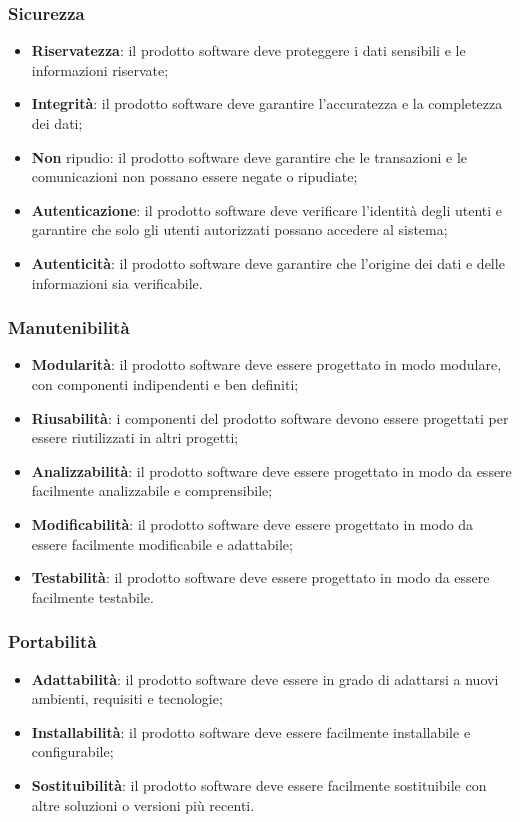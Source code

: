 \subsubsection{Sicurezza}
\begin{itemize}
    \item \textbf{Riservatezza}: il prodotto software deve proteggere i dati sensibili e le informazioni riservate;
    \item \textbf{Integrità}: il prodotto software deve garantire l'accuratezza e la completezza dei dati;
    \item \textbf{Non} ripudio: il prodotto software deve garantire che le transazioni e le comunicazioni non possano essere negate o ripudiate;
    \item \textbf{Autenticazione}: il prodotto software deve verificare l'identità degli utenti e garantire che solo gli utenti autorizzati possano accedere al sistema;
    \item \textbf{Autenticità}: il prodotto software deve garantire che l'origine dei dati e delle informazioni sia verificabile.
\end{itemize}
\subsubsection{Manutenibilità}
\begin{itemize}
    \item \textbf{Modularità}: il prodotto software deve essere progettato in modo modulare, con componenti indipendenti e ben definiti;
    \item \textbf{Riusabilità}: i componenti del prodotto software devono essere progettati per essere riutilizzati in altri progetti;
    \item \textbf{Analizzabilità}: il prodotto software deve essere progettato in modo da essere facilmente analizzabile e comprensibile;
    \item \textbf{Modificabilità}: il prodotto software deve essere progettato in modo da essere facilmente modificabile e adattabile;
    \item \textbf{Testabilità}: il prodotto software deve essere progettato in modo da essere facilmente testabile.
\end{itemize}
\subsubsection{Portabilità}
\begin{itemize}
    \item \textbf{Adattabilità}: il prodotto software deve essere in grado di adattarsi a nuovi ambienti, requisiti e tecnologie;
    \item \textbf{Installabilità}: il prodotto software deve essere facilmente installabile e configurabile;
    \item \textbf{Sostituibilità}: il prodotto software deve essere facilmente sostituibile con altre soluzioni o versioni più recenti.
\end{itemize}
